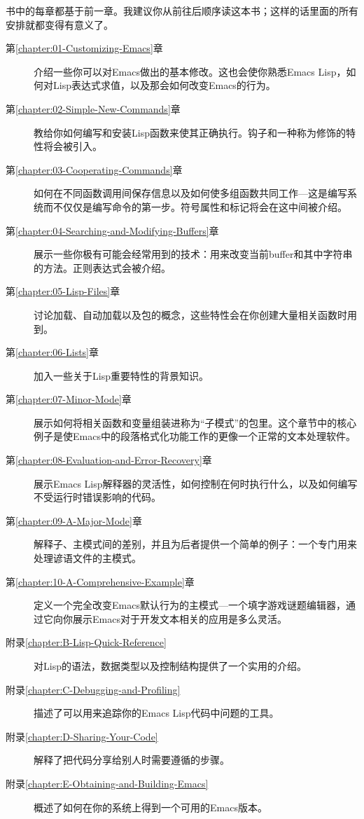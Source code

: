 书中的每章都基于前一章。我建议你从前往后顺序读这本书；这样的话里面的所有安排就都变得有意义了。

\begin{description}
  \item[第\ref{chapter:01-Customizing-Emacs}章] 介绍一些你可以对Emacs做出的基本修改。这也会使你熟悉Emacs Lisp，如何对Lisp表达式求值，以及那会如何改变Emacs的行为。
  \item[第\ref{chapter:02-Simple-New-Commands}章] 教给你如何编写和安装Lisp函数来使其正确执行。钩子和一种称为修饰的特性将会被引入。
  \item[第\ref{chapter:03-Cooperating-Commands}章] 如何在不同函数调用间保存信息以及如何使多组函数共同工作---这是编写系统而不仅仅是编写命令的第一步。符号属性和标记将会在这中间被介绍。
  \item[第\ref{chapter:04-Searching-and-Modifying-Buffers}章] 展示一些你极有可能会经常用到的技术：用来改变当前buffer和其中字符串的方法。正则表达式会被介绍。
  \item[第\ref{chapter:05-Lisp-Files}章] 讨论加载、自动加载以及包的概念，这些特性会在你创建大量相关函数时用到。
  \item[第\ref{chapter:06-Lists}章] 加入一些关于Lisp重要特性的背景知识。
  \item[第\ref{chapter:07-Minor-Mode}章] 展示如何将相关函数和变量组装进称为“子模式”的包里。这个章节中的核心例子是使Emacs中的段落格式化功能工作的更像一个正常的文本处理软件。
  \item[第\ref{chapter:08-Evaluation-and-Error-Recovery}章] 展示Emacs Lisp解释器的灵活性，如何控制在何时执行什么，以及如何编写不受运行时错误影响的代码。
  \item[第\ref{chapter:09-A-Major-Mode}章] 解释子、主模式间的差别，并且为后者提供一个简单的例子：一个专门用来处理谚语文件的主模式。
  \item[第\ref{chapter:10-A-Comprehensive-Example}章] 定义一个完全改变Emacs默认行为的主模式---一个填字游戏谜题编辑器，通过它向你展示Emacs对于开发文本相关的应用是多么灵活。
  \item[附录\ref{chapter:B-Lisp-Quick-Reference}] 对Lisp的语法，数据类型以及控制结构提供了一个实用的介绍。
  \item[附录\ref{chapter:C-Debugging-and-Profiling}] 描述了可以用来追踪你的Emacs Lisp代码中问题的工具。
  \item[附录\ref{chapter:D-Sharing-Your-Code}] 解释了把代码分享给别人时需要遵循的步骤。
  \item[附录\ref{chapter:E-Obtaining-and-Building-Emacs}] 概述了如何在你的系统上得到一个可用的Emacs版本。
\end{description}

